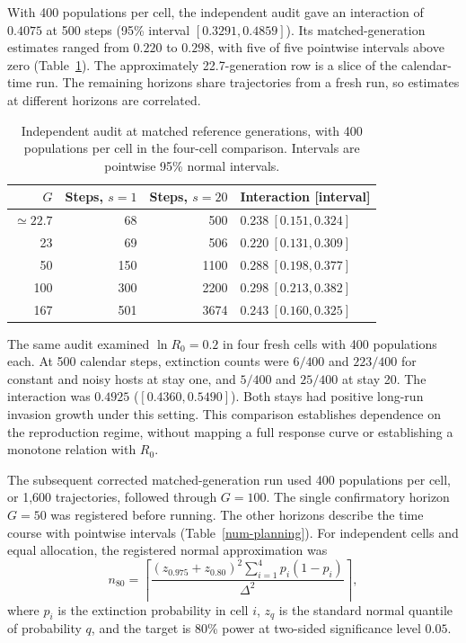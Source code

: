 With 400 populations per cell, the independent audit gave an interaction
of $0.4075$ at 500 steps (95\% interval $[0.3291,0.4859]$).
Its matched-generation estimates ranged from $0.220$ to $0.298$, with
five of five pointwise intervals above zero (Table~\ref{num-audit-matched}).
The approximately 22.7-generation row is a slice of the calendar-time run.
The remaining horizons share trajectories from a fresh run, so estimates
at different horizons are correlated.

\begin{table}[htbp]
\centering
\caption{Independent audit at matched reference generations, with 400 populations
per cell in the four-cell comparison. Intervals are pointwise 95\% normal intervals.}
\label{num-audit-matched}
\begin{tabular}{rrrl}
\toprule
$G$ & Steps, $s=1$ & Steps, $s=20$ & Interaction [interval] \\
\midrule
$\simeq22.7$ & 68 & 500 & $0.238\ [0.151,0.324]$ \\
23 & 69 & 506 & $0.220\ [0.131,0.309]$ \\
50 & 150 & 1100 & $0.288\ [0.198,0.377]$ \\
100 & 300 & 2200 & $0.298\ [0.213,0.382]$ \\
167 & 501 & 3674 & $0.243\ [0.160,0.325]$ \\
\bottomrule
\end{tabular}
\end{table}

The same audit examined $\ln R_0=0.2$ in four fresh cells with 400
populations each. At 500 calendar steps, extinction counts were $6/400$
and $223/400$ for constant and noisy hosts at stay one, and $5/400$ and
$25/400$ at stay 20. The interaction was $0.4925$
($[0.4360,0.5490]$). Both stays had positive long-run invasion growth
under this setting. This comparison establishes dependence on the
reproduction regime, without mapping a full response curve or establishing
a monotone relation with $R_0$.

The subsequent corrected matched-generation run used 400 populations per
cell, or 1,600 trajectories, followed through $G=100$.
The single confirmatory horizon $G=50$ was registered before running.
The other horizons describe the time course with pointwise intervals
(Table~\ref{num-planning}). For independent cells and equal allocation,
the registered normal approximation was
\begin{equation}
 n_{80}=\left\lceil
 \frac{(z_{0.975}+z_{0.80})^2\sum_{i=1}^{4}p_i(1-p_i)}{\Delta^2}
 \right\rceil,
 \label{num-power}
\end{equation}
where $p_i$ is the extinction probability in cell $i$, $z_q$ is the
standard normal quantile of probability $q$, and the target is 80\% power
at two-sided significance level $0.05$.

